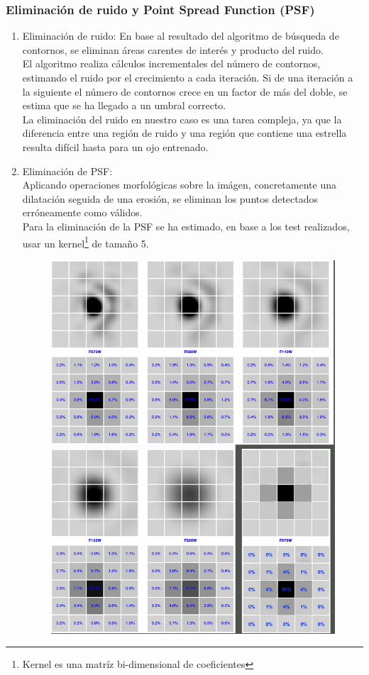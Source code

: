 	\subsubsection{Eliminación de ruido y Point Spread Function (PSF)}
	\begin{enumerate}
	\item Eliminación de ruido:
	En base al resultado del algoritmo de búsqueda de contornos, se eliminan áreas carentes de interés y producto del ruido.
	\\El algoritmo realiza cálculos incrementales del número de contornos, estimando el ruido por el crecimiento a cada iteración. Si de una iteración a la siguiente el número de contornos crece en un factor de más del doble, se estima que se ha llegado a un umbral correcto.
	\\
	La eliminación del ruido en nuestro caso es una tarea compleja, ya que la diferencia entre una región de ruido y una región que contiene una estrella resulta difícil hasta para un ojo entrenado.
	\newline
	\item Eliminación de PSF:\\
    Aplicando operaciones morfológicas sobre la imágen, concretamente una dilatación seguida de una erosión, se eliminan los puntos detectados erróneamente como válidos.
    \\
    Para la eliminación de la PSF se ha estimado, en base a los test realizados, usar un kernel\footnote{Kernel es una matríz bi-dimensional de coeficientes} de tamaño 5.
    	\begin{figure}[!htb]
    		\centering
    		\includegraphics[width=1\textwidth]{images/PSFUnificadas.png}

\end{figure}
\end{enumerate}
